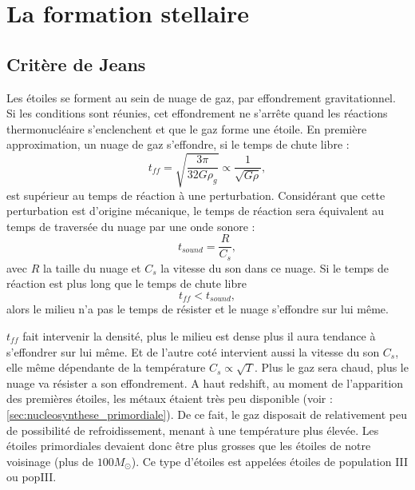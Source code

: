 


\section{La formation stellaire}

\subsection{Critère de Jeans}


Les étoiles se forment au sein de nuage de gaz, par effondrement gravitationnel.
Si les conditions sont réunies, cet effondrement ne s'arrête quand les réactions thermonucléaire s'enclenchent et que le gaz forme une étoile.
En première approximation, un nuage de gaz s'effondre, si le temps de chute libre : 
\begin{equation}
t_{ff} =  \sqrt{\frac{3\pi}{32G\rho_g}} \propto \frac{1}{\sqrt{G \rho}},
\label{eq:tff}
\end{equation}
est supérieur au temps de réaction à une perturbation.
Considérant que cette perturbation est d'origine mécanique, le temps de réaction sera équivalent au temps de traversée du nuage par une onde sonore :
 \begin{equation}
t_{sound} = \frac{R}{C_s},
\end{equation}
avec $R$ la taille du nuage et $C_s$ la vitesse du son dans ce nuage.
Si le temps de réaction est plus long que le temps de chute libre
\begin{equation}
t_{ff} < t_{sound},
\end{equation}
alors le milieu n'a pas le temps de résister et le nuage s'effondre sur lui même.

$t_{ff}$ fait intervenir la densité, plus le milieu est dense plus il aura tendance à s'effondrer sur lui même.
Et de l'autre coté intervient aussi la vitesse du son $C_s$, elle même dépendante de la température $C_s \propto \sqrt{T}$.
Plus le gaz sera chaud, plus le nuage va résister a son effondrement.
A haut redshift, au moment de l'apparition des premières étoiles, les métaux étaient très peu disponible (voir :\ref{sec:nucleosynthese_primordiale}).
De ce fait, le gaz disposait de relativement peu de possibilité de refroidissement, menant à une température plus élevée.
Les étoiles primordiales devaient donc être plus grosses que les étoiles de notre voisinage (plus de $100M_\odot$).
Ce type d'étoiles est appelées étoiles de population III ou popIII.

